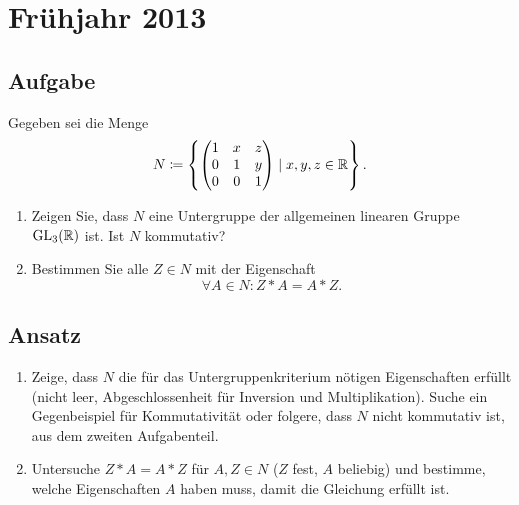 \newpage

\section{Frühjahr 2013}

\subsection{Aufgabe}
Gegeben sei die Menge
\begin{equation*}
	N \coloneqq \left \{ \begin{pmatrix}
		1 & x & z \\
		0 & 1 & y \\
		0 & 0 & 1
	\end{pmatrix} \mid x,y,z \in \mathbb{R} \right \}\text{.}
\end{equation*}
\begin{enumerate}
	\item Zeigen Sie, dass \( N \) eine Untergruppe der allgemeinen linearen Gruppe \( \text{GL}_3(\mathbb{R}) \) ist. Ist \( N \) kommutativ?
	\item Bestimmen Sie alle \( Z \in N \) mit der Eigenschaft
	\begin{equation*}
	 	\forall A \in N: Z*A = A*Z\text{.}
	 \end{equation*} 
\end{enumerate}

\subsection{Ansatz}
\begin{enumerate}
	\item Zeige, dass \( N \) die für das Untergruppenkriterium nötigen Eigenschaften erfüllt (nicht leer, Abgeschlossenheit für Inversion und Multiplikation). Suche ein Gegenbeispiel für Kommutativität oder folgere, dass \( N \) nicht kommutativ ist, aus dem zweiten Aufgabenteil.
	\item Untersuche \( Z*A = A*Z \) für \( A, Z \in N \) (\( Z \) fest, \( A \) beliebig) und bestimme, welche Eigenschaften \( A \) haben muss, damit die Gleichung erfüllt ist.
\end{enumerate}

